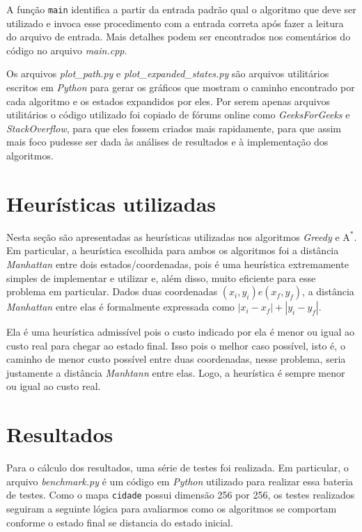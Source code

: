 \documentclass{article}
\begin{document}
A função \texttt{main} identifica a partir da entrada padrão qual o algoritmo que deve ser utilizado e invoca esse procedimento
com a entrada correta após fazer a leitura do arquivo de entrada. Mais detalhes podem ser encontrados nos comentários do código no arquivo \textit{main.cpp}.

Os arquivos \textit{plot\_path.py} e \textit{plot\_expanded\_states.py} são arquivos utilitários escritos em \textit{Python} para gerar os gráficos que mostram o caminho encontrado por cada algoritmo
e os estados expandidos por eles. Por serem apenas arquivos utilitários o código utilizado foi copiado de fórums online como \textit{GeeksForGeeks} e \textit{StackOverflow},
para que eles fossem criados mais rapidamente, para que assim mais foco pudesse ser dada às análises de resultados e à implementação dos algoritmos.

\section{Heurísticas utilizadas}

Nesta seção são apresentadas as heurísticas utilizadas nos algoritmos \textit{Greedy} e \(\text{A}^*\). Em particular, a heurística escolhida para ambos os algoritmos
foi a distância \textit{Manhattan} entre dois estados/coordenadas, pois é uma heurística extremamente simples de implementar e utilizar e, além disso, muito eficiente para esse problema em particular.
Dados duas coordenadas \((x_i, y_i) e (x_f, y_f)\), a distância \textit{Manhattan} entre elas é formalmente expressada como \(|x_i - x_f| + |y_i - y_f|\).

Ela é uma heurística admissível pois o custo indicado por ela é menor ou igual ao custo real para chegar ao estado final. Isso pois o melhor caso possível, isto é, o caminho de menor custo possível
entre duas coordenadas, nesse problema, seria justamente a distância \textit{Manhtann} entre elas. Logo, a heurística é sempre menor ou igual ao custo real.

\section{Resultados}

Para o cálculo dos resultados, uma série de testes foi realizada. Em particular, o arquivo \textit{benchmark.py} é um código em \textit{Python} utilizado para realizar essa bateria de testes.
Como o mapa \texttt{cidade} possui dimensão 256 por 256, os testes realizados seguiram a seguinte lógica para avaliarmos como os algoritmos se comportam conforme o estado final
se distancia do estado inicial.
\end{document}
